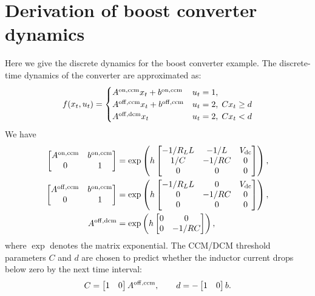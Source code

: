 \documentclass[12pt]{article}
\begin{document}
\appendix

\clearpage



\clearpage
\section{Derivation of boost converter dynamics}
\label{s-boost-derivation}




Here we give the discrete dynamics for the boost converter example.
The discrete-time dynamics of the converter are approximated as:
\begin{align*}
f(x_t, u_t) = 
\begin{cases}
A^{\rm on,ccm} x_t + b^{\rm on,ccm} & u_t = 1,  \\
A^{\rm off,ccm} x_t + b^{\rm off,ccm} & u_t = 2, \; Cx_t \geq d \\
A^{\rm off,dcm} x_t & u_t = 2, \; Cx_t < d \\
\end{cases}
\end{align*}
We have
\begin{align*}
\begin{bmatrix}
A^{\rm on,ccm} & b^{\rm on,ccm}  \\
0 & 1
\end{bmatrix}
&=
\exp\left(
h \begin{bmatrix} -1/R_L L & -1/L & V_{\rm dc} \\ 1/C & -1/RC & 0 \\ 0 & 0 & 0 \end{bmatrix}
\right),
\\
\begin{bmatrix}
A^{\rm off,ccm} & b^{\rm on,ccm}  \\
0 & 1
\end{bmatrix}
&=
\exp\left(
h \begin{bmatrix} -1/R_L L & 0 & V_{\rm dc} \\ 0 & -1/RC & 0 \\ 0 & 0 & 0 \end{bmatrix}
\right),
\\
A^{\rm off,dcm} 
&=
\exp\left( h \begin{bmatrix} 0 & 0  \\ 0 & -1/RC  \end{bmatrix} \right),
\end{align*}
where $\exp$ denotes the matrix exponential.
The CCM/DCM threshold parameters $C$ and $d$ are chosen
to predict whether the inductor current drops below zero by the next time interval:
\begin{align*}
C = \begin{bmatrix} 1 & 0 \end{bmatrix} A^{\rm off,ccm},
\qquad
d = -\begin{bmatrix} 1 & 0 \end{bmatrix} b.
\end{align*}
\end{document}
